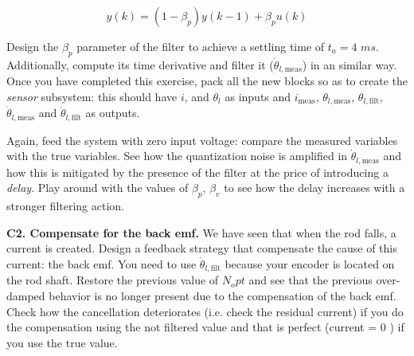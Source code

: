 \documentclass[11pt]{article}
\begin{document}
\begin{equation}
y(k) = (1-\beta_p)y(k-1) + \beta_p u(k)
\end{equation}

Design the $\beta_p$ parameter of the filter to achieve a settling time of $t_a = 4$ $ms$.
Additionally, compute its  time derivative and filter it ($\dot{\theta}_{l,\mathrm{meas}}$) in an similar way. 
Once you have completed this exercise, pack all the new blocks so as 
to create the \textit{sensor} subsystem: this should have $i$, 
and $\theta_l$ as inputs and $i_{\mathrm{meas}}$, 
$\theta_{l,\mathrm{meas}}$, $\theta_{l,\mathrm{filt}}$, 
$\dot{\theta}_{l,\mathrm{meas}}$ and $\dot{\theta}_{l,\mathrm{filt}}$ as outputs.

Again, feed the system with zero input voltage: compare the measured variables with the true variables.
See how the quantization noise is amplified in  $\dot{\theta}_{l,\mathrm{meas}}$ and how this is mitigated 
by the presence of the filter at the price of introducing a \textit{delay}. Play around with the values of $\beta_p$, $\beta_v$ 
to see how the delay increases with a stronger filtering action. 
%
%
\par
\textbf{C2. Compensate for the back emf.} 
We have seen that when the rod falls, a current is created. 
Design a feedback strategy that compensate the cause of this current: 
the back emf. You need to use $\dot{\theta}_{l,\mathrm{filt}}$ because your encoder is located 
on the rod shaft. Restore the previous value of $N_opt$ and see that the previous over-damped behavior 
is no longer present due to the compensation of the back emf. Check how the cancellation deteriorates (i.e. check the residual current)
if you do the compensation using the not filtered value and that is perfect (current = 0 ) if you use the true value. 
\end{document}
